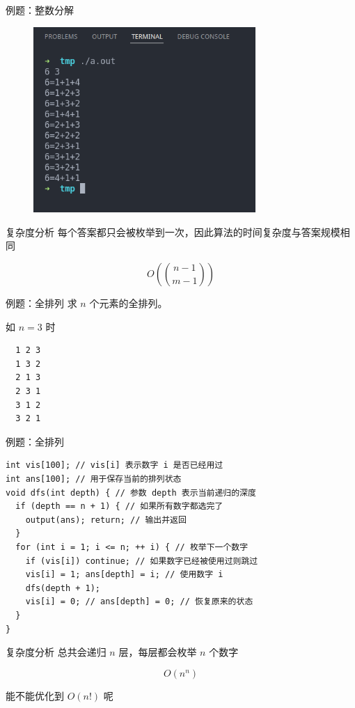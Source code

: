 \documentclass[12pt,aspectratio=169]{beamer}
\begin{document}
\begin{frame}[fragile]{例题：整数分解}
  \begin{figure}
    \includegraphics[height=200pt]{example1.png}
  \end{figure}
\end{frame}

\begin{frame}[fragile]{复杂度分析}
  每个答案都只会被枚举到一次，因此算法的时间复杂度与答案规模相同\pause

  $$O({n-1 \choose m-1})$$
\end{frame}

\begin{frame}[fragile]{例题：全排列}
  求 $n$ 个元素的全排列。

  如 $n=3$ 时

  \begin{verbatim}
  1 2 3
  1 3 2
  2 1 3
  2 3 1
  3 1 2
  3 2 1
  \end{verbatim}
\end{frame}


\begin{frame}[fragile]{例题：全排列}
  \begin{verbatim}
int vis[100]; // vis[i] 表示数字 i 是否已经用过
int ans[100]; // 用于保存当前的排列状态
void dfs(int depth) { // 参数 depth 表示当前递归的深度
  if (depth == n + 1) { // 如果所有数字都选完了
    output(ans); return; // 输出并返回
  }
  for (int i = 1; i <= n; ++ i) { // 枚举下一个数字
    if (vis[i]) continue; // 如果数字已经被使用过则跳过
    vis[i] = 1; ans[depth] = i; // 使用数字 i
    dfs(depth + 1);
    vis[i] = 0; // ans[depth] = 0; // 恢复原来的状态
  }
}
  \end{verbatim}
\end{frame}

\begin{frame}[fragile]{复杂度分析}
  总共会递归 $n$ 层，每层都会枚举 $n$ 个数字\pause

  $$O(n^n)$$\pause

  能不能优化到 $O(n!)$ 呢
\end{frame}
\end{document}
